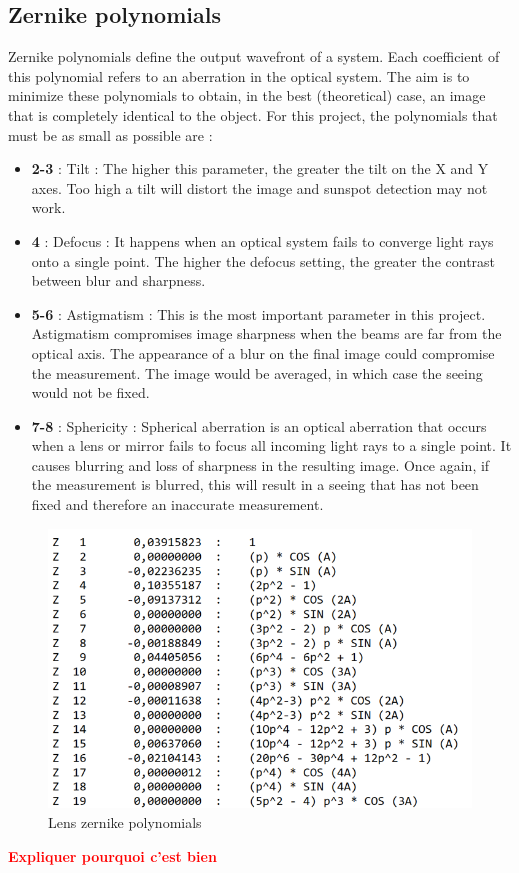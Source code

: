 \subsection{Zernike polynomials}
Zernike polynomials define the output wavefront of a system. Each coefficient of this polynomial refers to an
aberration in the optical system. The aim is to minimize these polynomials to obtain, in the best (theoretical)
case, an image that is completely identical to the object. For this project, the polynomials that must be as small as possible are :
\begin{itemize}
    \item \textbf{2-3} : Tilt : The higher this parameter, the greater the tilt on the X and Y axes. Too high a tilt will distort
          the image and sunspot detection may not work.
    \item \textbf{4}   : Defocus : It happens when an optical system fails to converge light rays onto a single point. The higher the
          defocus setting, the greater the contrast between blur and sharpness.
    \item \textbf{5-6} : Astigmatism : This is the most important parameter in this project. Astigmatism compromises image
          sharpness when the beams are far from the optical axis. The appearance of a blur on the final image could compromise the
          measurement. The image would be averaged, in which case the seeing would not be fixed.
    \item \textbf{7-8} : Sphericity : Spherical aberration is an optical aberration that occurs when a lens or mirror fails to focus all
          incoming light rays to a single point. It causes blurring and loss of sharpness in the resulting image. Once again, if the measurement
          is blurred, this will result in a seeing that has not been fixed and therefore an inaccurate measurement.
\end{itemize}
\begin{figure}[H]
    \centering
    \includegraphics[scale=0.9]{assets/figures/Optical Design/Zemax_Zernik.png}
    \caption{Lens zernike polynomials}
    \label{fig:Opti_ZemaxZernik}
\end{figure}
\textbf{\textcolor{red}{Expliquer pourquoi c'est bien}}
